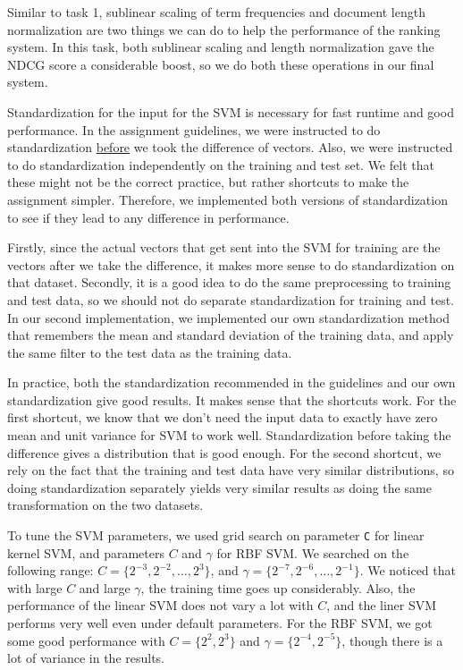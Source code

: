\documentclass[10pt,twocolumn]{article}
\begin{document}
Similar to task 1, sublinear scaling of term frequencies and document length normalization are two things we can do to help the performance of the ranking system. In this task, both sublinear scaling and length normalization gave the NDCG score a considerable boost, so we do both these operations in our final system.

Standardization for the input for the SVM is necessary for fast runtime and good performance. In the assignment guidelines, we were instructed to do standardization \underline{before} we took the difference of vectors. Also, we were instructed to do standardization independently on the training and test set. We felt that these might not be the correct practice, but rather shortcuts to make the assignment simpler. Therefore, we implemented both versions of standardization to see if they lead to any difference in performance.

Firstly, since the actual vectors that get sent into the SVM for training are the vectors after we take the difference, it makes more sense to do standardization on that dataset. Secondly, it is a good idea to do the same preprocessing to training and test data, so we should not do separate standardization for training and test. In our second implementation, we implemented our own standardization method that remembers the mean and standard deviation of the training data, and apply the same filter to the test data as the training data.

In practice, both the standardization recommended in the guidelines and our own standardization give good results. It makes sense that the shortcuts work. For the first shortcut, we know that we don't need the input data to exactly have zero mean and unit variance for SVM to work well. Standardization before taking the difference gives a distribution that is good enough. For the second shortcut, we rely on the fact that the training and test data have very similar distributions, so doing standardization separately yields very similar results as doing the same transformation on the two datasets.

To tune the SVM parameters, we used grid search on parameter \texttt{C} for linear kernel SVM, and parameters $C$ and $\gamma$ for RBF SVM. We searched on the following range: $C=\{2^{-3},2^{-2},\dots,2^{3}\}$, and $\gamma=\{2^{-7},2^{-6},\dots,2^{-1}\}$. We noticed that with large $C$ and large $\gamma$, the training time goes up considerably. Also, the performance of the linear SVM does not vary a lot with $C$, and the liner SVM performs very well even under default parameters. For the RBF SVM, we got some good performance with $C=\{2^{2},2^{3}\}$ and $\gamma=\{2^{-4},2^{-5}\}$, though there is a lot of variance in the results.
\end{document}
